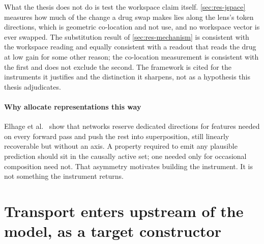 %
\begin{scopelimit}
What the thesis does not do is test the workspace claim itself.
\cref{sec:res-jspace} measures how much of the change a drug swap makes lies
along the lens's token directions, which is geometric co-location and not use,
and no workspace vector is ever swapped. The substitution result
of \cref{sec:res-mechanism} is consistent with the workspace reading and
equally consistent with a readout that reads the drug at low gain for some
other reason; the co-location measurement is consistent with the first and
does not exclude the second. The framework is cited for the instruments it
justifies and the distinction it sharpens, not as a hypothesis this thesis
adjudicates.
\end{scopelimit}

\paragraph{Why allocate representations this way} Elhage et
al.~\cite{superposition} show that networks reserve dedicated directions for
features needed on every forward pass and push the rest into superposition, still
linearly recoverable but without an axis. A property required to emit any
plausible prediction should sit in the causally active set; one needed only for
occasional composition need not. That asymmetry motivates building the
instrument. It is not something the instrument returns.

\section{Transport enters upstream of the model, as a target constructor}
\label{sec:lit-ot}
\framedecl{-}


